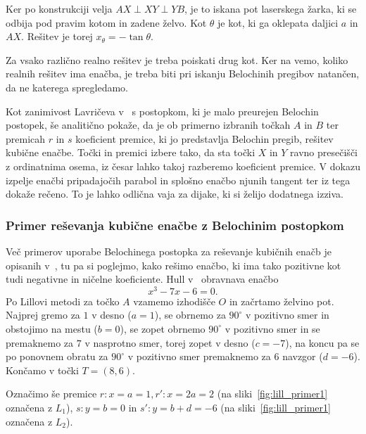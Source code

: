 Ker po konstrukciji velja $ AX \perp XY \perp YB $, je to iskana pot laserskega žarka, ki se odbija pod pravim kotom in zadene želvo. Kot $\theta$ je kot, ki ga oklepata daljici $a$ in $AX$. Rešitev je torej $x_{\theta} = - \tan \theta$.

\begin{opomba}
    Za vsako različno realno rešitev je treba poiskati drug kot. Ker na vemo, koliko realnih rešitev ima enačba, je treba biti pri iskanju Belochinih pregibov natančen, da ne katerega spregledamo.
\end{opomba}

Kot zanimivost Lavričeva v~\cite[str.\ 10--13]{lavric2013} s postopkom, ki je malo preurejen Belochin postopek, še analitično pokaže, da je ob primerno izbranih točkah $A$ in $B$ ter premicah $r$ in $s$ koeficient premice, ki jo predstavlja Belochin pregib, rešitev kubične enačbe. Točki in premici izbere tako, da sta točki $X$ in $Y$ ravno presečišči z ordinatnima osema, iz česar lahko takoj razberemo koeficient premice. V dokazu izpelje enačbi pripadajočih parabol in splošno enačbo njunih tangent ter iz tega dokaže rečeno. To je lahko odlična vaja za dijake, ki si želijo dodatnega izziva.

\subsubsection*{Primer reševanja kubične enačbe z Belochinim postopkom}

Več primerov uporabe Belochinega postopka za reševanje kubičnih enačb je opisanih v~\cite[38--44]{zore2022}, tu pa si poglejmo, kako rešimo enačbo, ki ima tako pozitivne kot tudi negativne in ničelne koeficiente. Hull v~\cite[str.\ 90--92]{hull2013} obravnava enačbo
$$ x^3 - 7x - 6 = 0.$$
Po Lillovi metodi za točko $A$ vzamemo izhodišče $O$ in začrtamo želvino pot. Najprej gremo za $1$ v desno ($a=1$), se obrnemo za $90^\circ$ v pozitivno smer in obstojimo na mestu ($b=0$), se zopet obrnemo  $90^\circ$ v pozitivno smer in se premaknemo za $7$ v nasprotno smer, torej zopet v desno ($c=-7$), na koncu pa se po ponovnem obratu za $90^\circ$ v pozitivno smer premaknemo za 6 navzgor ($d=-6$). Končamo v točki $T = (8, 6)$.

Označimo še premice $r: x = a = 1, r': x = 2a = 2$ (na sliki~\ref{fig:lill_primer1} označena z $L_1$), $s: y = b = 0$ in $s': y = b + d = -6$ (na sliki~\ref{fig:lill_primer1} označena z $L_2$).

